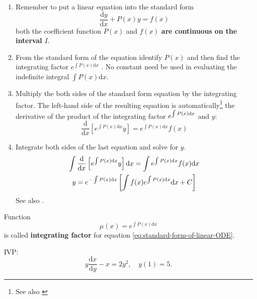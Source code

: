 \begin{enumerate}
    \item Remember to put a linear equation into the standard form
        \begin{equation}\label{eq:standard-form-of-linear-ODE}
            \dfrac{\mathrm{d}y}{\mathrm{d}x} + P(x) y = f(x)
        \end{equation}
        both the coefficient function $P(x)$ and $f(x)$
        \textbf{are continuous on the interval $I$}.
    \item 
        From the standard form of the equation 
        identify $P(x)$ and then find the
        integrating factor
        $e^{\int P(x) \mathrm{d}x}$
        . 
        No constant need be used in evaluating the
        indefinite integral $\int P(x) \mathrm{d}x$.
    \item 
        Multiply the both sides of the standard form equation by the integrating
        factor. The left-hand side of the resulting equation 
        is automatically\footnote{See also \cite[page 55]{fcde}} the
        derivative of the product of the integrating factor
        $\cramped{e^{\int P(x) \mathrm{d}x}}$
        and $y$:
        \begin{equation}
            \dfrac{\mathrm{d}}{\mathrm{d}x}
            \left[
                e^{\int P(x) \mathrm{d}x} y
            \right]
            =
            e^{\int P(x) \mathrm{d}x} f(x)
        \end{equation}
    \item 
        Integrate both sides of the last equation and solve for $y$\cite[page 56]{fcde}.
        \begin{gather}\label{eq:solution-linear-first-order-DE}
            \int
                \dfrac{\mathrm{d}}{\mathrm{d}x}
                \left[
                    e^{\int P(x) \mathrm{d}x} y
                \right]
            \mathrm{d}x
            = \int e^{\int P(x) \mathrm{d}x} f(x) \mathrm{d}x \notag \\
            y = e^{-\int P(x) \mathrm{d}x} 
            \left[
                \int f(x) e^{\int P(x) \mathrm{d}x} \mathrm{d}x + C
            \right]
        \end{gather}
        See also \cite[page 139, pdf 150]{we}.
\end{enumerate}

Function
\[
    \mu (x) = e^{\int P(x) \mathrm{d}x}
\]
is called \textbf{integrating factor} for equation \ref{eq:standard-form-of-linear-ODE}.

\begin{example}
    IVP:
    \[
        y \dfrac{\mathrm{d}x}{\mathrm{d}y} -x = 2y^2, \quad y(1) = 5.
    \]
    \cite[page 63]{fcde}

\end{example}

